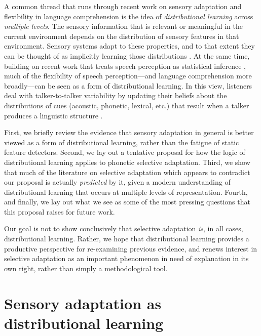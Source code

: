 A common thread that runs through recent work on sensory adaptation and flexibility in language comprehension is the idea of \emph{distributional learning} across \emph{multiple levels}.  The sensory information that is relevant or meaningful in the current environment depends on the distribution of sensory features in that environment. Sensory systems adapt to these properties, and to that extent they can be thought of as implicitly learning those distributions \autocite{Brenner2000,Fairhall2001,Gutnisky2008,Sharpee2006,Stocker2006}.  At the same time, building on recent work that treats speech perception as statistical inference \autocite[e.g.,][]{Clayards2008,Feldman2009a,Kleinschmidt2015,Norris2008,Sonderegger2010}, much of the flexibility of speech perception---and language comprehension more broadly---can be seen as a form of distributional learning.  In this view, listeners deal with talker-to-talker variability by updating their beliefs about the distributions of cues (acoustic, phonetic, lexical, etc.) that result when a talker produces a linguistic structure \autocite[phonetic category, word, syntactic structure, pragmatic intention, etc.;][]{Fine2013,Guediche2014,Holt2006c,Idemaru2011,Kleinschmidt2015,YildirimInPress}.

First, we briefly review the evidence that sensory adaptation in general is better viewed as a form of distributional learning, rather than the fatigue of static feature detectors.  Second, we lay out a tentative proposal for how the logic of distributional learning applies to phonetic selective adaptation.  Third, we show that much of the literature on selective adaptation which appears to contradict our proposal is actually \emph{predicted} by it, given a modern understanding of distributional learning that occurs at multiple levels of representation.  Fourth, and finally, we lay out what we see as some of the most pressing questions that this proposal raises for future work.

Our goal is not to show conclusively that selective adaptation \emph{is}, in all cases, distributional learning.  Rather, we hope that distributional learning provides a productive perspective for re-examining previous evidence, and renews interest in selective adaptation as an important phenomenon in need of explanation in its own right, rather than simply a methodological tool.
\label{r-phenomenon}

\section{Sensory adaptation as distributional learning}
\label{sec:sens-adapt-dist-learn}

